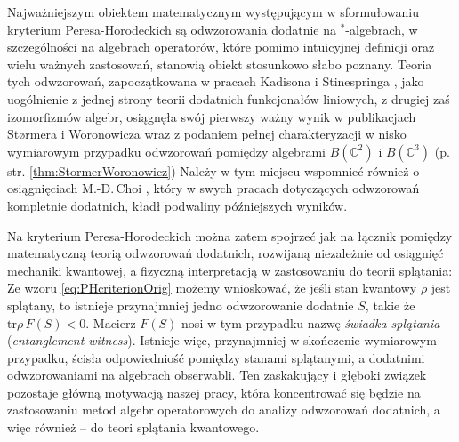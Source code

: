 Najważniejszym obiektem matematycznym występującym w sformułowaniu
kryterium Peresa-Horodeckich są odwzorowania dodatnie na $^{*}$-algebrach,
w szczególności na algebrach operatorów,
które pomimo intuicyjnej definicji oraz wielu ważnych zastosowań,
stanowią obiekt stosunkowo słabo poznany.
Teoria tych odwzorowań, zapoczątkowana w pracach Kadisona
\cite{kadison1952generalized}
i Stinespringa
\cite{stinespring1955positive},
jako uogólnienie z jednej strony teorii dodatnich funkcjonałów liniowych,
z drugiej zaś izomorfizmów algebr,
osiągnęła swój pierwszy ważny wynik w publikacjach Størmera i Woronowicza
\cite{stormer1963positive,woronowicz1976positive}
wraz z podaniem pełnej charakteryzacji w nisko wymiarowym przypadku
odwzorowań pomiędzy algebrami $B(\mathbb{C}^{2})$ i $B(\mathbb{C}^{3})$
(p. str. \ref{thm:StormerWoronowicz})
Należy w tym miejscu wspomnieć również o osiągnięciach M.-D.\,Choi
\cite{choi1975positive,choi1975completely,choi1977extremal},
który w swych pracach dotyczących odwzorowań kompletnie dodatnich,
kładł podwaliny późniejszych wyników.

Na kryterium Peresa-Horodeckich można zatem spojrzeć jak na łącznik pomiędzy
matematyczną teorią odwzorowań dodatnich,
rozwijaną niezależnie od osiągnięć mechaniki kwantowej,
a fizyczną interpretacją w zastosowaniu do teorii splątania:
Ze wzoru \eqref{eq:PHcriterionOrig} możemy wnioskować,
że jeśli stan kwantowy $\rho$ jest splątany,
to istnieje przynajmniej jedno odwzorowanie dodatnie $S$,
takie że $\text{tr} \rho \, F(S) < 0$.
Macierz $F(S)$ nosi w tym przypadku nazwę
\emph{świadka splątania} (\emph{entanglement witness}).
Istnieje więc,
przynajmniej w skończenie wymiarowym przypadku,
ścisła odpowiedniość pomiędzy stanami splątanymi,
a dodatnimi odwzorowaniami na algebrach obserwabli.
Ten zaskakujący i głęboki związek pozostaje główną motywacją naszej pracy,
która koncentrować się będzie na zastosowaniu metod algebr operatorowych
do analizy odwzorowań dodatnich,
a więc również -- do teori splątania kwantowego.

